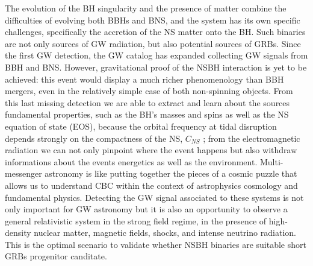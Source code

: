\documentclass[binding=0.6cm, LaM]{sapthesis}
\begin{document}
        The evolution of the BH singularity and the presence of matter combine
        the difficulties of evolving both BBHs and BNS, and the system has its own specific challenges,
        specifically the accretion of the NS matter onto the BH.
        Such binaries are not only sources of GW radiation, but also potential sources of GRBs.
        Since the first GW detection, the GW catalog has expanded collecting GW signals from BBH and BNS.
        However, gravitational proof of the NSBH interaction is yet to be achieved:
        this event would display a much richer phenomenology than BBH mergers,
        even in the relatively simple case of both non-spinning objects.
        From this last missing detection we are able to extract and learn about
        the sources fundamental properties, such as the BH’s masses and spins
        as well as the NS equation of state (EOS), because the orbital frequency at tidal disruption
        depends strongly on the compactness of the NS, $C_{NS}$ \cite{204};
        from the electromagnetic radiation we can not only
        pinpoint where the event happens but also withdraw informations about the events energetics as well as the environment.
        Multi-messenger astronomy is like putting together the pieces of a cosmic puzzle
        that allows us to understand CBC within the context of astrophysics cosmology and fundamental physics.
        Detecting the GW signal associated to these systems is not only important for
        GW astronomy but it is also an opportunity to observe a general relativistic system in the strong field regime,
        in the presence of high-density nuclear matter, magnetic fields, shocks, and intense neutrino radiation.
        This is the optimal scenario to validate whether NSBH binaries are suitable short GRBs progenitor canditate.
\end{document}
